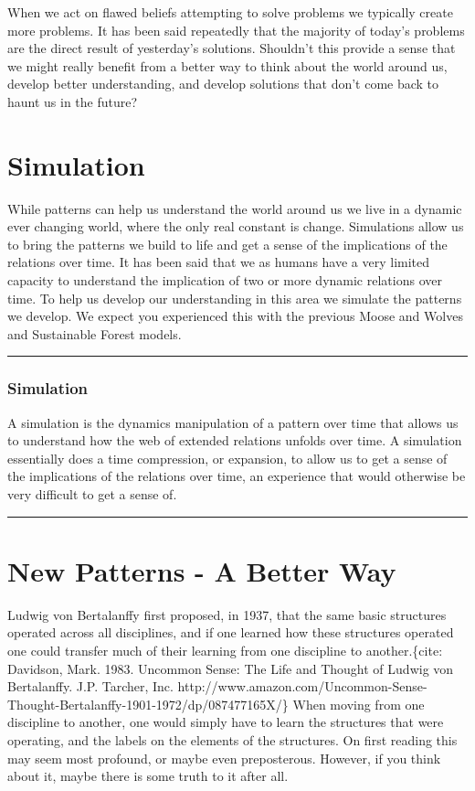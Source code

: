 \documentclass[]{memoir}
\begin{document}
When we act on flawed beliefs attempting to solve problems we typically
create more problems. It has been said repeatedly that the majority of
today's problems are the direct result of yesterday's solutions.
Shouldn't this provide a sense that we might really benefit from a
better way to think about the world around us, develop better
understanding, and develop solutions that don't come back to haunt us in
the future?

\section{Simulation}

While patterns can help us understand the world around us we live in a
dynamic ever changing world, where the only real constant is change.
Simulations allow us to bring the patterns we build to life and get a
sense of the implications of the relations over time. It has been said
that we as humans have a very limited capacity to understand the
implication of two or more dynamic relations over time. To help us
develop our understanding in this area we simulate the patterns we
develop. We expect you experienced this with the previous Moose and
Wolves and Sustainable Forest models.

\begin{center}\rule{3in}{0.4pt}\end{center}

\subsubsection{Simulation}

A simulation is the dynamics manipulation of a pattern over time that
allows us to understand how the web of extended relations unfolds over
time. A simulation essentially does a time compression, or expansion, to
allow us to get a sense of the implications of the relations over time,
an experience that would otherwise be very difficult to get a sense of.

\begin{center}\rule{3in}{0.4pt}\end{center}

\section{New Patterns - A Better Way}

Ludwig von Bertalanffy first proposed, in 1937, that the same basic
structures operated across all disciplines, and if one learned how these
structures operated one could transfer much of their learning from one
discipline to another.\{cite: Davidson, Mark. 1983. Uncommon Sense: The
Life and Thought of Ludwig von Bertalanffy. J.P. Tarcher, Inc.
http://www.amazon.com/Uncommon-Sense-Thought-Bertalanffy-1901-1972/dp/087477165X/\}
When moving from one discipline to another, one would simply have to
learn the structures that were operating, and the labels on the elements
of the structures. On first reading this may seem most profound, or
maybe even preposterous. However, if you think about it, maybe there is
some truth to it after all.
\end{document}
